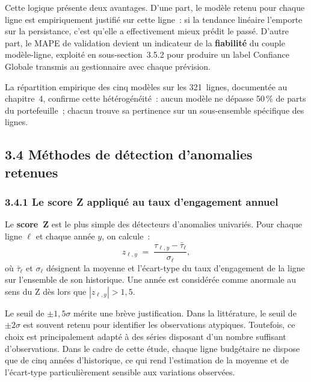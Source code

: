 Cette logique pr\'esente deux avantages. D'une part, le mod\`ele retenu pour
chaque ligne est empiriquement justifi\'e sur cette ligne~: si la tendance
lin\'eaire l'emporte sur la persistance, c'est qu'elle a effectivement mieux
pr\'edit le pass\'e. D'autre part, le MAPE de validation devient un indicateur
de la \textbf{fiabilit\'e} du couple mod\`ele-ligne, exploit\'e en
sous-section~3.5.2 pour produire un label \og Confiance Globale \fg{} transmis
au gestionnaire avec chaque pr\'evision.

La r\'epartition empirique des cinq mod\`eles sur les 321~lignes,
document\'ee au chapitre~4, confirme cette h\'et\'erog\'en\'eit\'e~: aucun
mod\`ele ne d\'epasse 50\,\% de parts du portefeuille~; chacun trouve sa
pertinence sur un sous-ensemble sp\'ecifique des lignes.
\fi

\subsection*{3.4 \quad M\'ethodes de d\'etection d'anomalies retenues}

\subsubsection*{3.4.1 \quad Le score Z appliqu\'e au taux d'engagement annuel}

Le \textbf{score~Z} est le plus simple des d\'etecteurs d'anomalies
univari\'es. Pour chaque ligne $\ell$ et chaque ann\'ee $y$, on calcule~:
$$
z_{\ell,y} \;=\; \frac{\tau_{\ell,y} - \bar{\tau}_\ell}{\sigma_\ell},
$$
o\`u $\bar{\tau}_\ell$ et $\sigma_\ell$ d\'esignent la moyenne et l'\'ecart-type
du taux d'engagement de la ligne sur l'ensemble de son historique. Une ann\'ee
est consid\'er\'ee comme anormale au sens du Z d\`es lors que
$|z_{\ell,y}| > 1{,}5$.

Le seuil de \textbf{$\pm 1{,}5\sigma$} m\'erite une br\`eve justification.
Dans la litt\'erature, le seuil de $\pm 2\sigma$ est souvent retenu pour
identifier les observations atypiques. Toutefois, ce choix est principalement
adapt\'e \`a des s\'eries disposant d'un nombre suffisant d'observations.
Dans le cadre de cette \'etude, chaque ligne budg\'etaire ne dispose que de
cinq ann\'ees d'historique, ce qui rend l'estimation de la moyenne et de
l'\'ecart-type particuli\`erement sensible aux variations observ\'ees.

